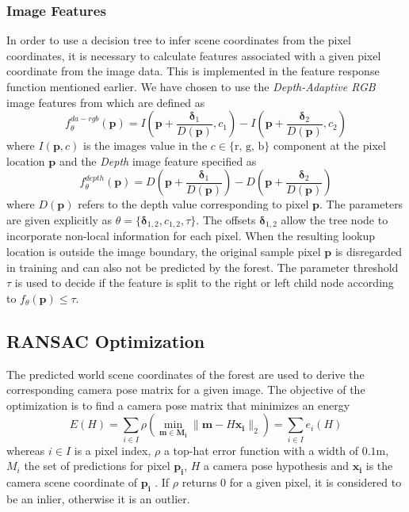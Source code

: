 \documentclass[final]{cvpr}
\begin{document}
\subsubsection{Image Features}
In order to use a decision tree to infer scene coordinates from the pixel coordinates,
it is necessary to calculate features associated with a given pixel coordinate from the
image data. This is implemented in the feature response function mentioned earlier.
We have chosen to use the \textit{Depth-Adaptive RGB} image features from \cite{shotton2013} which
are defined as
\begin{equation}
	f_{\theta}^{da-rgb}(\boldsymbol{p}) = I\left(\boldsymbol{p} + \frac{\boldsymbol{\delta}_1}{D(\boldsymbol{p})}, c_1\right)
	- I\left(\boldsymbol{p} + \frac{\boldsymbol{\delta}_2}{D(\boldsymbol{p})}, c_2\right)
\end{equation}
where $I(\boldsymbol{p}, c)$ is the images value in the $c \in \{\text{r, g, b}\}$ component at
the pixel location $\boldsymbol{p}$ and the \textit{Depth} image feature specified as
\begin{equation}
	f_{\theta}^{depth}(\boldsymbol{p}) = D\left(\boldsymbol{p} + \frac{\boldsymbol{\delta}_1}{D(\boldsymbol{p})}\right)
	- D\left(\boldsymbol{p} + \frac{\boldsymbol{\delta}_2}{D(\boldsymbol{p})}\right)
\end{equation}
where $D(\boldsymbol{p})$ refers to the depth value corresponding to pixel $\boldsymbol{p}$.
The parameters are given explicitly as $\theta = \{\boldsymbol{\delta}_{1,2}, c_{1,2}, \tau\}$. 
The offsets $\boldsymbol{\delta}_{1,2}$
allow the tree node to incorporate non-local information for each pixel. When the resulting
lookup location is outside the image boundary, the original sample pixel $\boldsymbol{p}$ is
disregarded in training and can also not be predicted by the forest. The parameter threshold 
$\tau$ is used to decide if the feature is split to the right or left child node according to 
$f_{\theta}(\boldsymbol{p}) \leq \tau$.


\subsection{RANSAC Optimization}
The predicted world scene coordinates of the forest are used to derive the corresponding camera pose matrix for a given image. 
The objective of the optimization is to find a camera pose matrix that minimizes an energy
\begin{equation}\label{energy_function}
	E(H) = \sum_{i \in I} \rho(\min_{\boldsymbol{m} \in \boldsymbol{M_{i}}} 
	\| \boldsymbol{m} - H \boldsymbol{x_{i}} \|_{2}) = \sum_{i \in I}e_{i}(H)
\end{equation}
whereas $i \in I$ is a pixel index,  $\rho$ a top-hat error function with a width of $0.1$m, $M_{i}$ 
the set of predictions for pixel $\boldsymbol{p_{i}}$, $H$ a camera pose hypothesis and $\boldsymbol{x_{i}}$ is the camera
scene coordinate of $\boldsymbol{p_{i}}$ \cite{shotton2013}. If $\rho$ returns $0$ for a given pixel, it is considered
to be an inlier, otherwise it is an outlier.
\end{document}
